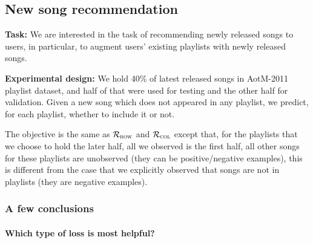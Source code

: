 \subsection{New song recommendation}

{\bf Task:} 
We are interested in the task of recommending newly released songs to users,
in particular, to augment users' existing playlists with newly released songs.

{\bf Experimental design:} 
We hold 40\% of latest released songs in AotM-2011~\cite{mcfee2012hypergraph} playlist dataset,
and half of that were used for testing and the other half for validation.
Given a new song which does not appeared in any playlist, 
we predict, for each playlist, whether to include it or not.

The objective is the same as $\mathcal{R}_\textsc{row}$ and $\mathcal{R}_\textsc{col}$ except that,
for the playlists that we choose to hold the later half, all we observed is the first half, 
all other songs for these playlists are unobserved (they can be positive/negative examples),
this is different from the case that we explicitly observed that songs are not in playlists (they are negative examples).


\subsubsection{A few conclusions}
\begin{table}[!h]
\centering
\caption{Statistics of dataset}
\end{table}

\paragraph{Which type of loss is most helpful?}
\begin{table}[!h]
\centering
\caption{Empirical results (AUC)}
\end{table}

